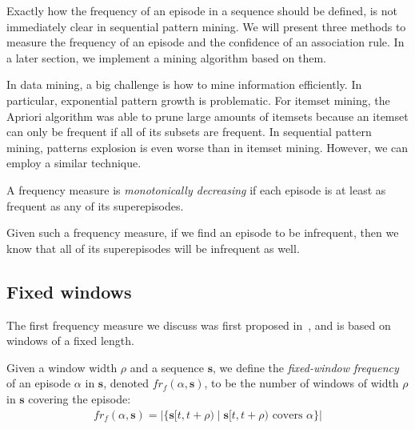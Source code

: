 Exactly how the frequency of an episode in a sequence should be defined, is not immediately clear in sequential pattern mining. We will present three methods to measure the frequency of an episode and the confidence of an association rule. In a later section, we implement a mining algorithm based on them.

In data mining, a big challenge is how to mine information efficiently. In particular, exponential pattern growth is problematic. For itemset mining, the Apriori algorithm \cite{agrawal1994fast} was able to prune large amounts of itemsets because an itemset can only be frequent if all of its subsets are frequent. In sequential pattern mining, patterns explosion is even worse than in itemset mining. However, we can employ a similar technique.

\begin{definition}
A frequency measure is \emph{monotonically decreasing} if each episode is at least as frequent as any of its superepisodes.
\end{definition}

Given such a frequency measure, if we find an episode to be infrequent, then we know that all of its superepisodes will be infrequent as well.


\subsection{Fixed windows}

The first frequency measure we discuss was first proposed in~\cite{mannila1997discovery}, and is based on windows of a fixed length.

\begin{definition}
Given a window width $ \rho $ and a sequence $ \boldsymbol{s} $, we define the \emph{fixed-window frequency} of an episode $ \alpha $ in $ \boldsymbol{s} $, denoted $ fr_f(\alpha, \boldsymbol{s}) $, to be the number of windows of width $ \rho $ in $ \boldsymbol{s} $ covering the episode:
\begin{align*}
fr_f(\alpha, \boldsymbol{s}) = | \{ \boldsymbol{s}[t, t + \rho) \mid \boldsymbol{s}[t, t + \rho) \text{ covers } \alpha \} |
\end{align*}
\end{definition}

